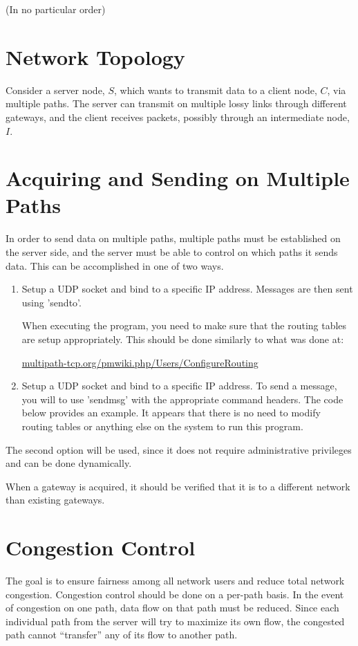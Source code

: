 \documentclass{article}
\begin{document}
(In no particular order)

\section{Network Topology}
Consider a server node, $S$, which wants to transmit data to a client node, $C$, via multiple paths.  The server can transmit on multiple lossy links through different gateways, and the client receives packets, possibly through an intermediate node, $I$.

\section{Acquiring and Sending on Multiple Paths}
In order to send data on multiple paths, multiple paths must be established on the server side, and the server must be able to control on which paths it sends data.  This can be accomplished in one of two ways.

\begin{enumerate}
\item
Setup a UDP socket and bind to a specific
IP address. Messages are then sent using
'sendto'.

When executing the program,
you need to make sure that the routing 
tables are setup appropriately.  This 
should be done similarly to what was 
done at: 

\url{multipath-tcp.org/pmwiki.php/Users/ConfigureRouting}

\item
Setup a UDP socket and bind to a specific
IP address. To send a message, you will
to use 'sendmsg' with the appropriate 
command headers.  The code below provides
an example.  It appears that there is no 
need to modify routing tables or anything
else on the system to run this program.
\end{enumerate}
%
The second option will be used, since it does not require administrative privileges and can be done dynamically.

When a gateway is acquired, it should be verified that it is to a different network than existing gateways.

\section{Congestion Control}
The goal is to ensure fairness among all network users and reduce total network congestion. 
Congestion control should be done on a per-path basis.  In the event of congestion on one path, data flow on that path must be reduced.  Since each individual path from the server will try to maximize its own flow, the congested path cannot ``transfer'' any of its flow to another path.
\end{document}
